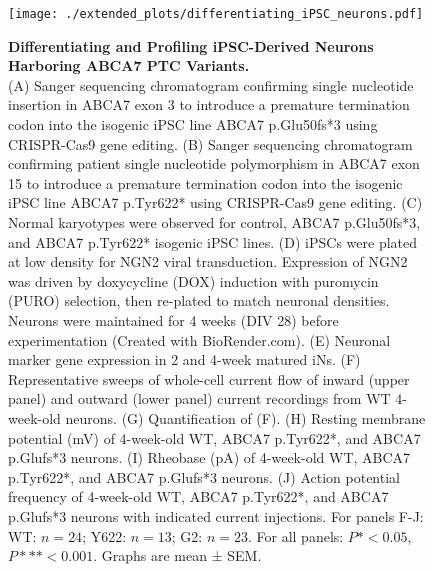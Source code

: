 \begin{figure}[ht]
    \centerline{\texttt{[image: ./extended\_plots/differentiating\_iPSC\_neurons.pdf]}}
    \caption{
        \textbf{Differentiating and Profiling iPSC-Derived Neurons Harboring ABCA7 PTC Variants.}\\[1ex]
        (A) Sanger sequencing chromatogram confirming single nucleotide insertion in ABCA7 exon 3 to introduce a premature termination codon into the isogenic iPSC line ABCA7 p.Glu50fs*3 using CRISPR-Cas9 gene editing. 
        (B) Sanger sequencing chromatogram confirming patient single nucleotide polymorphism in ABCA7 exon 15 to introduce a premature termination codon into the isogenic iPSC line ABCA7 p.Tyr622* using CRISPR-Cas9 gene editing. 
        (C) Normal karyotypes were observed for control, ABCA7 p.Glu50fs*3, and ABCA7 p.Tyr622* isogenic iPSC lines. 
        (D) iPSCs were plated at low density for NGN2 viral transduction. Expression of NGN2 was driven by doxycycline (DOX) induction with puromycin (PURO) selection, then re-plated to match neuronal densities. Neurons were maintained for 4 weeks (DIV 28) before experimentation (Created with BioRender.com). 
        (E) Neuronal marker gene expression in 2 and 4-week matured iNs. 
        (F) Representative sweeps of whole-cell current flow of inward (upper panel) and outward (lower panel) current recordings from WT 4-week-old neurons. 
        (G) Quantification of (F). 
        (H) Resting membrane potential (mV) of 4-week-old WT, ABCA7 p.Tyr622*, and ABCA7 p.Glufs*3 neurons. 
        (I) Rheobase (pA) of 4-week-old WT, ABCA7 p.Tyr622*, and ABCA7 p.Glufs*3 neurons. 
        (J) Action potential frequency of 4-week-old WT, ABCA7 p.Tyr622*, and ABCA7 p.Glufs*3 neurons with indicated current injections. For panels F-J: WT: $n=24$; Y622: $n=13$; G2: $n=23$. For all panels: $P*<0.05$, $P***<0.001$. Graphs are mean ± SEM.
    }
    \label{fig:differentiating_iPSC_neurons}
\end{figure}

